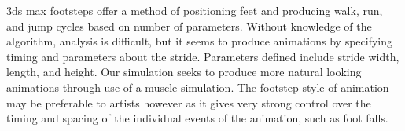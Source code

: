 3ds max footsteps offer a method of positioning feet and producing walk, run, and jump cycles based on  number of parameters.  Without knowledge of the algorithm, analysis is difficult, but it seems to produce animations by specifying timing and parameters about the stride.  Parameters defined include stride width, length, and height.  Our simulation seeks to produce more natural looking animations through use of a muscle simulation.  The footstep style of animation may be preferable to artists however as it gives very strong control over the timing and spacing of the individual events of the animation, such as foot falls.